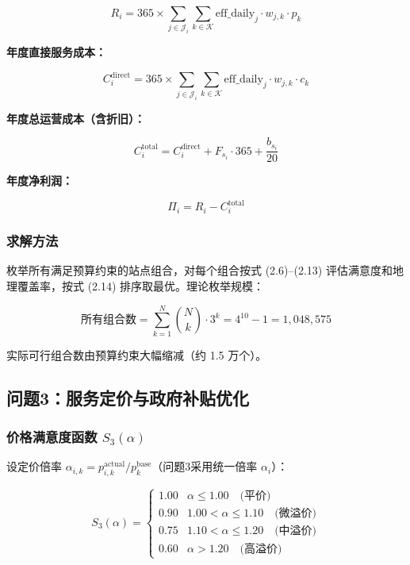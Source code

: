 \documentclass[UTF8]{ctexart}
\begin{document}
\begin{equation}
R_i = 365 \times \sum_{j\in\mathcal{J}_i}\sum_{k\in\mathcal{K}} \text{eff\_daily}_j \cdot w_{j,k} \cdot p_k \tag{2.15}
\end{equation}

\textbf{年度直接服务成本：}

\begin{equation}
C_i^{\text{direct}} = 365 \times \sum_{j\in\mathcal{J}_i}\sum_{k\in\mathcal{K}} \text{eff\_daily}_j \cdot w_{j,k} \cdot c_k \tag{2.16}
\end{equation}

\textbf{年度总运营成本（含折旧）：}

\begin{equation}
C_i^{\text{total}} = C_i^{\text{direct}} + F_{s_i} \cdot 365 + \frac{b_{s_i}}{20} \tag{2.17}
\end{equation}

\textbf{年度净利润：}

\begin{equation}
\Pi_i = R_i - C_i^{\text{total}} \tag{2.18}
\end{equation}

\subsubsection{求解方法}

枚举所有满足预算约束的站点组合，对每个组合按式 (2.6)–(2.13) 评估满意度和地理覆盖率，按式 (2.14) 排序取最优。理论枚举规模：

\begin{equation}
\text{所有组合数} = \sum_{k=1}^{N} \binom{N}{k} \cdot 3^k = 4^{10} - 1 = 1{,}048{,}575 \tag{2.19}
\end{equation}

实际可行组合数由预算约束大幅缩减（约 1.5 万个）。


\subsection{问题3：服务定价与政府补贴优化}

\subsubsection{价格满意度函数 $S_3(\alpha)$}

设定价倍率 $\alpha_{i,k} = p_{i,k}^{\text{actual}} / p_k^{\text{base}}$（问题3采用统一倍率 $\alpha_i$）：

\begin{equation}
S_3(\alpha) = \begin{cases} 1.00 & \alpha \leq 1.00 \quad \text{(平价)} \\ 0.90 & 1.00 < \alpha \leq 1.10 \quad \text{(微溢价)} \\ 0.75 & 1.10 < \alpha \leq 1.20 \quad \text{(中溢价)} \\ 0.60 & \alpha > 1.20 \quad \text{(高溢价)} \end{cases} \tag{3.1}
\end{equation}
\end{document}
